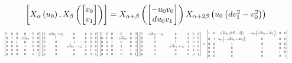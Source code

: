 \documentclass[11pt]{article}
\theoremstyle{definition}
\begin{document}
\[
\scaletoalign{\textwidth}{\left[ X_{\alpha}\left(u_{0}\right), X_{\beta}\left(\left[\begin{matrix}v_{0}\\v_{1}\end{matrix}\right]\right) \right] = X_{\alpha + \beta}\left(\left[\begin{matrix}- u_{0} v_{0}\\d u_{0} v_{1}\end{matrix}\right]\right) X_{\alpha + 2\beta}\left(u_{0} \left(d v_{1}^{2} - v_{0}^{2}\right)\right)}
\]
\[
\scaletoalign{\textwidth}{{\left[\begin{matrix}1 & 0 & 0 & 0 & 0 & 0\\0 & 1 & 0 & \sqrt{d} u_{0} & 0 & 0\\0 & 0 & 1 & 0 & 0 & 0\\0 & 0 & 0 & 1 & 0 & 0\\0 & 0 & 0 & 0 & 1 & 0\\0 & 0 & 0 & 0 & 0 & 1\end{matrix}\right]} {\left[\begin{matrix}1 & \sqrt{d} v_{1} + v_{0} & 0 & 0 & 0 & 0\\0 & 1 & 0 & 0 & 0 & 0\\0 & 0 & 1 & 0 & 0 & 0\\0 & 0 & \sqrt{d} v_{1} - v_{0} & 1 & 0 & 0\\0 & 0 & 0 & 0 & 1 & 0\\0 & 0 & 0 & 0 & 0 & 1\end{matrix}\right]} {\left[\begin{matrix}1 & 0 & 0 & 0 & 0 & 0\\0 & 1 & 0 & - \sqrt{d} u_{0} & 0 & 0\\0 & 0 & 1 & 0 & 0 & 0\\0 & 0 & 0 & 1 & 0 & 0\\0 & 0 & 0 & 0 & 1 & 0\\0 & 0 & 0 & 0 & 0 & 1\end{matrix}\right]} {\left[\begin{matrix}1 & - \sqrt{d} v_{1} - v_{0} & 0 & 0 & 0 & 0\\0 & 1 & 0 & 0 & 0 & 0\\0 & 0 & 1 & 0 & 0 & 0\\0 & 0 & - \sqrt{d} v_{1} + v_{0} & 1 & 0 & 0\\0 & 0 & 0 & 0 & 1 & 0\\0 & 0 & 0 & 0 & 0 & 1\end{matrix}\right]} = {\left[\begin{matrix}1 & 0 & \sqrt{d} u_{0} \left(d v_{1}^{2} - v_{0}^{2}\right) & - u_{0} \left(\sqrt{d} v_{0} + d v_{1}\right) & 0 & 0\\0 & 1 & u_{0} \left(- \sqrt{d} v_{0} + d v_{1}\right) & 0 & 0 & 0\\0 & 0 & 1 & 0 & 0 & 0\\0 & 0 & 0 & 1 & 0 & 0\\0 & 0 & 0 & 0 & 1 & 0\\0 & 0 & 0 & 0 & 0 & 1\end{matrix}\right]}}
\]
\end{document}
